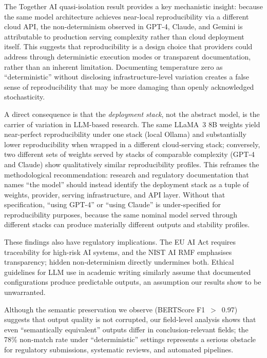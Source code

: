 \documentclass[sn-nature]{sn-jnl}
\begin{document}
The Together AI quasi-isolation result provides a key mechanistic insight: because the same model architecture achieves near-local reproducibility via a different cloud API, the non-determinism observed in GPT-4, Claude, and Gemini is attributable to production serving complexity rather than cloud deployment itself.
This suggests that reproducibility is a design choice that providers could address through deterministic execution modes or transparent documentation, rather than an inherent limitation.
Documenting temperature zero as ``deterministic'' without disclosing infrastructure-level variation creates a false sense of reproducibility that may be more damaging than openly acknowledged stochasticity.

A direct consequence is that the \emph{deployment stack}, not the abstract model, is the carrier of variation in LLM-based research.
The same LLaMA~3 8B weights yield near-perfect reproducibility under one stack (local Ollama) and substantially lower reproducibility when wrapped in a different cloud-serving stack; conversely, two different sets of weights served by stacks of comparable complexity (GPT-4 and Claude) show qualitatively similar reproducibility profiles.
This reframes the methodological recommendation: research and regulatory documentation that names ``the model'' should instead identify the deployment stack as a tuple of weights, provider, serving infrastructure, and API layer.
Without that specification, ``using GPT-4'' or ``using Claude'' is under-specified for reproducibility purposes, because the same nominal model served through different stacks can produce materially different outputs and stability profiles.

These findings also have regulatory implications.
The EU AI Act\cite{euaiact2024} requires traceability for high-risk AI systems, and the NIST AI RMF\cite{nist2023ai} emphasises transparency; hidden non-determinism directly undermines both.
Ethical guidelines for LLM use in academic writing\cite{porsdam2024ethics} similarly assume that documented configurations produce predictable outputs, an assumption our results show to be unwarranted.

Although the semantic preservation we observe (BERTScore F1~$>$~0.97) suggests that output quality is not corrupted, our field-level analysis shows that even ``semantically equivalent'' outputs differ in conclusion-relevant fields; the 78\% non-match rate under ``deterministic'' settings represents a serious obstacle for regulatory submissions, systematic reviews, and automated pipelines.
\end{document}
